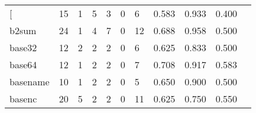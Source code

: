 \begin{longtable}{lp{1.2cm}p{1.2cm}p{1.2cm}p{1.2cm}p{1.2cm}p{1.2cm}p{1.2cm}p{1.2cm}p{1.2cm}p{1.2cm}}
\bottomrule
\endlastfoot
{[}         &                                    15 &                                                  1 &                                                  5 &                                                  3 &                                                  0 &                                                  6 &                                         0.583 &                                              0.933 &                                              0.400 \\
b2sum     &                                    24 &                                                  1 &                                                  4 &                                                  7 &                                                  0 &                                                 12 &                                         0.688 &                                              0.958 &                                              0.500 \\
base32    &                                    12 &                                                  2 &                                                  2 &                                                  2 &                                                  0 &                                                  6 &                                         0.625 &                                              0.833 &                                              0.500 \\
base64    &                                    12 &                                                  1 &                                                  2 &                                                  2 &                                                  0 &                                                  7 &                                         0.708 &                                              0.917 &                                              0.583 \\
basename  &                                    10 &                                                  1 &                                                  2 &                                                  2 &                                                  0 &                                                  5 &                                         0.650 &                                              0.900 &                                              0.500 \\
basenc    &                                    20 &                                                  5 &                                                  2 &                                                  2 &                                                  0 &                                                 11 &                                         0.625 &                                              0.750 &                                              0.550 \\

\end{longtable}
